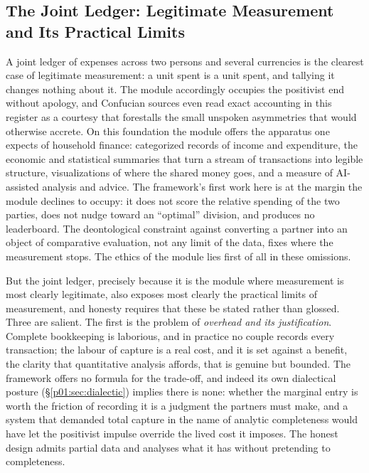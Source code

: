\documentclass[11pt,a4paper]{article}
\begin{document}
\subsection{The Joint Ledger: Legitimate Measurement and Its Practical Limits}\label{p01:sec:ledger}

A joint ledger of expenses across two persons and several currencies is the clearest case of legitimate measurement: a unit spent is a unit spent, and tallying it changes nothing about it. The module accordingly occupies the positivist end without apology, and Confucian sources even read exact accounting in this register as a courtesy that forestalls the small unspoken asymmetries that would otherwise accrete. On this foundation the module offers the apparatus one expects of household finance: categorized records of income and expenditure, the economic and statistical summaries that turn a stream of transactions into legible structure, visualizations of where the shared money goes, and a measure of AI-assisted analysis and advice. The framework's first work here is at the margin the module declines to occupy: it does not score the relative spending of the two parties, does not nudge toward an ``optimal'' division, and produces no leaderboard. The deontological constraint against converting a partner into an object of comparative evaluation, not any limit of the data, fixes where the measurement stops. The ethics of the module lies first of all in these omissions.

But the joint ledger, precisely because it is the module where measurement is most clearly legitimate, also exposes most clearly the practical limits of measurement, and honesty requires that these be stated rather than glossed. Three are salient. The first is the problem of \emph{overhead and its justification}. Complete bookkeeping is laborious, and in practice no couple records every transaction; the labour of capture is a real cost, and it is set against a benefit, the clarity that quantitative analysis affords, that is genuine but bounded. The framework offers no formula for the trade-off, and indeed its own dialectical posture (§\ref{p01:sec:dialectic}) implies there is none: whether the marginal entry is worth the friction of recording it is a judgment the partners must make, and a system that demanded total capture in the name of analytic completeness would have let the positivist impulse override the lived cost it imposes. The honest design admits partial data and analyses what it has without pretending to completeness.
\end{document}
